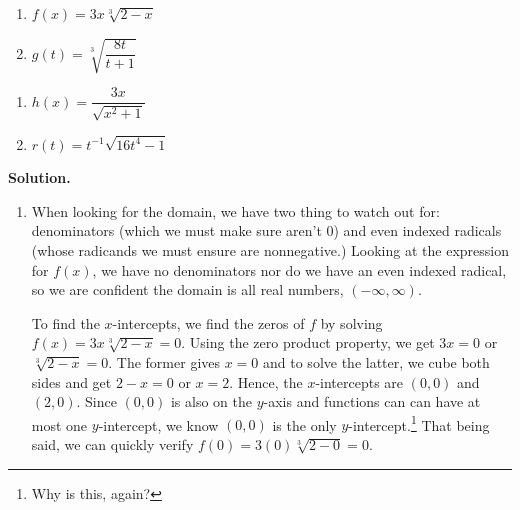 \begin{ex}
\begin{itemize}
\end{itemize}

\begin{multicols}{2}
\begin{enumerate}

\item  $f(x) = 3x \sqrt[3]{2-x}$ 

\item  $g(t) = \sqrt[3]{\dfrac{8t}{t+1}}$

\setcounter{HW}{\value{enumi}}
\end{enumerate}
\end{multicols}

\begin{multicols}{2}
\begin{enumerate}
\setcounter{enumi}{\value{HW}}

\item  $h(x) = \dfrac{3x}{\sqrt{x^2 + 1}}$

\item  $r(t) = t^{-1} \sqrt{16t^4-1}$ 

\setcounter{HW}{\value{enumi}}
\end{enumerate}
\end{multicols}


{\bf Solution.} 

\begin{enumerate}

\item  When looking for the domain, we have two thing to watch out for:  denominators (which we must make sure aren't $0$) and even indexed radicals (whose radicands we must ensure are nonnegative.)  Looking at the expression for $f(x)$, we have no denominators nor do we have an even indexed radical, so we are confident the domain is all real numbers, $(-\infty, \infty)$. 

To find the $x$-intercepts, we find the zeros of $f$ by solving $f(x) =  3x \sqrt[3]{2-x} = 0$.  Using the zero product property, we get $3x = 0$ or $\sqrt[3]{2-x} = 0$.  The former gives $x = 0$ and to solve the latter, we cube both sides and get $2 - x = 0$ or $x = 2$.  Hence, the $x$-intercepts are $(0,0)$ and $(2,0)$.  Since $(0,0)$ is also on the $y$-axis and functions can can have at most one $y$-intercept, we know $(0,0)$ is the only $y$-intercept.\footnote{Why is this, again?}  That being said, we can quickly verify $f(0) = 3(0) \sqrt[3]{2-0} = 0$. 


\end{enumerate}
\end{ex}
